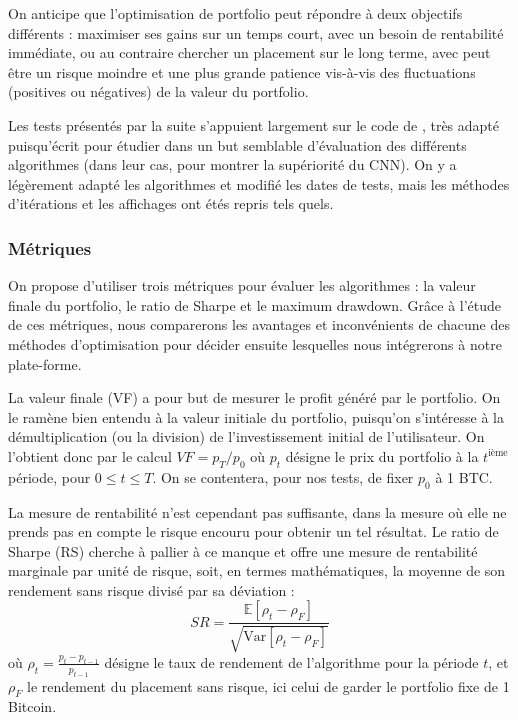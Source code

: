 \documentclass[a4paper, 10pt]{article}
\newcommand{\Var}{\mathrm{Var}}
\begin{document}
On anticipe que l'optimisation de portfolio peut répondre à deux objectifs différents : maximiser ses gains sur un temps court, avec un besoin de rentabilité immédiate, ou au contraire chercher un placement sur le long terme, avec peut être un risque moindre et une plus grande patience vis-à-vis des fluctuations (positives ou négatives) de la valeur du portfolio.

Les tests présentés par la suite s'appuient largement sur le code de \citet{Jiang2017}, très adapté puisqu'écrit pour étudier dans un but semblable d'évaluation des différents algorithmes (dans leur cas, pour montrer la supériorité du CNN). On y a légèrement adapté les algorithmes et modifié les dates de tests, mais les méthodes d'itérations et les affichages ont étés repris tels quels.

\subsubsection{Métriques}

On propose d'utiliser trois métriques pour évaluer les algorithmes : la valeur finale du portfolio, le ratio de Sharpe et le maximum drawdown. Grâce à l'étude de ces métriques, nous comparerons les avantages et inconvénients de chacune des méthodes d'optimisation pour décider ensuite lesquelles nous intégrerons à notre plate-forme.

La valeur finale (VF) a pour but de mesurer le profit généré par le portfolio. On le ramène bien entendu à la valeur initiale du portfolio, puisqu'on s'intéresse à la démultiplication (ou la division) de l'investissement initial de l'utilisateur. On l'obtient donc par le calcul $VF = p_T / p_0$ où $p_t$ désigne le prix du portfolio à la $t^{\text{ième}}$ période, pour $0 \leq t \leq T$. On se contentera, pour nos tests, de fixer $p_0$ à 1 BTC.

La mesure de rentabilité n'est cependant pas suffisante, dans la mesure où elle ne prends pas en compte le risque encouru pour obtenir un tel résultat. Le ratio de Sharpe (RS) \cite{Sharpe1994} cherche à pallier à ce manque et offre une mesure de rentabilité marginale par unité de risque, soit, en termes mathématiques, la moyenne de son rendement sans risque divisé par sa déviation :
\begin{equation}
    SR = \frac{\mathbb{E} \left[ \rho_t - \rho_F \right]}{\sqrt{\Var \left[ \rho_t - \rho_F \right]}}
\end{equation}
où $\rho_t = \frac{p_t - p_{t-1}}{p_{t-1}}$ désigne le taux de rendement de l'algorithme pour la période $t$, et $\rho_F$ le rendement du placement sans risque, ici celui de garder le portfolio fixe de 1 Bitcoin.
\end{document}
